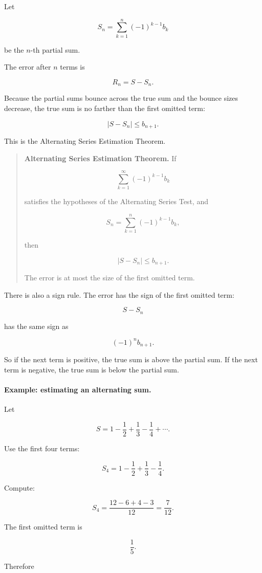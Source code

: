 Let

\[
S_n=\sum_{k=1}^{n}(-1)^{k-1}b_k
\]

be the \(n\)-th partial sum.

The error after \(n\) terms is

\[
R_n=S-S_n.
\]

Because the partial sums bounce across the true sum and the bounce sizes decrease, the
true sum is no farther than the first omitted term:

\[
\boxed{
|S-S_n|\le b_{n+1}.
}
\]

This is the Alternating Series Estimation Theorem.

\begin{quote}
\textbf{Alternating Series Estimation Theorem.}
If

\[
\sum_{k=1}^{\infty}(-1)^{k-1}b_k
\]

satisfies the hypotheses of the Alternating Series Test, and

\[
S_n=\sum_{k=1}^{n}(-1)^{k-1}b_k,
\]

then

\[
\boxed{
|S-S_n|\le b_{n+1}.
}
\]

The error is at most the size of the first omitted term.
\end{quote}

There is also a sign rule.  The error has the sign of the first omitted term:

\[
S-S_n
\]

has the same sign as

\[
(-1)^n b_{n+1}.
\]

So if the next term is positive, the true sum is above the partial sum.  If the next term
is negative, the true sum is below the partial sum.

\paragraph{Example: estimating an alternating sum.}
Let

\[
S=1-\frac12+\frac13-\frac14+\cdots.
\]

Use the first four terms:

\[
S_4=1-\frac12+\frac13-\frac14.
\]

Compute:

\[
S_4=\frac{12-6+4-3}{12}=\frac7{12}.
\]

The first omitted term is

\[
\frac15.
\]

Therefore

